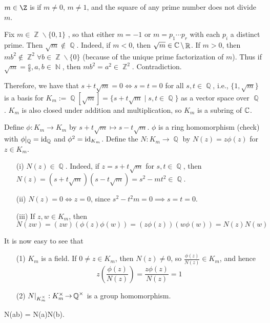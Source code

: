 \documentclass[11pt]{book}
\theoremstyle{definition}   \newtheorem{defn}[counter]{Definition} %
\newcommand{\bs}{\backslash}   \newcommand{\A}{\mathcal{A}}   \newcommand{\sy}{\textnormal{Syl}}   \newcommand{\size}[1]{\left| #1 \right|}
\DeclareMathOperator{\R}{\mathbb{R}}   \DeclareMathOperator{\N}{\mathbb{N}}   \DeclareMathOperator{\z}{\mathbb{Z}}   \DeclareMathOperator{\Q}{\mathbb{Q}}
\DeclareMathOperator{\ra}{\rightarrow}   \DeclareMathOperator{\Poly}{\mathbf{P}}   \DeclareMathOperator{\spn}{\textnormal{span}}   \DeclareMathOperator{\aut}{\textnormal{Aut}}
\newcommand{\vs}{\vspace{8pt}}
\numberwithin{counter}{chapter}
\begin{document}
\vs

\begin{def}
	$m \in \Z$ is  if $m \not= 0$, $m \not= 1$, and the square of any prime number does not divide $m$.
\end{def}


\begin{remark}
Fix $m \in \z\bs\{0,1\}$ , so that either $m = -1$ or $m = p_1 \cdots p_r$ with each $p_i$ a distinct prime. Then $\sqrt{m} \notin \Q$. Indeed, if $m < 0$, then $\sqrt{m} \in \C \bs \R$. If $m > 0$, then $mb^2 \notin \z^2 \forall b \in \z\bs\{0\}$ (because of the unique prime factorization of $m$). Thus if $\sqrt{m} = \frac{a}{b}, a,b \in \N$, then $mb^2 = a^2 \in \z^2$. Contradiction.

Therefore, we have that $s + t\sqrt{m} = 0 \iff s=t=0$ for all $s,t \in \Q$, i.e., $\{1,\sqrt{m}\}$ is a basis for $K_m := \Q[\sqrt{m}] = \{s + t\sqrt{m} \mid s,t \in \Q\}$ as a vector space over $\Q$. $K_m$ is also closed under addition and multiplication, so $K_m$ is a subring of $\operatorname{\mathbb{C}}$.

Define $\phi : K_m \ra K_m$ by $s+t\sqrt{m} \mapsto s-t\sqrt{m}$. $\phi$ is a ring homomorphism (check) with $\phi|_{\Q} = \id_{\Q}$ and $\phi^2 = \textnormal{id}_{K_m}$. Define the  $N : K_m \ra \Q$ by $N(z) = z \phi(z)$ for $z \in K_m$.
\begin{enumerate}
\item[(i)] $N(z) \in \Q$. Indeed, if $z = s+t\sqrt{m}$ for $s,t \in \Q$, then $N(z) = (s+t\sqrt{m})(s-t\sqrt{m}) = s^2-mt^2 \in \Q$.
\item[(ii)] $N(z) =0 \iff z=0$, since $s^2-t^2m = 0 \implies s=t=0$.
\item[(iii)] If $z,w \in K_m$, then
	\[N(zw) = (zw)(\phi(z)\phi(w)) = (z\phi(z))(w\phi(w)) = N(z)N(w) \]
\end{enumerate}
It is now easy to see that
\begin{enumerate}
\item[(1)] $K_m$ is a field. If $0 \ne z \in K_m$, then $N(z) \ne 0$, so $\frac{\phi(z)}{N(z)} \in K_m$, and hence
	\[z \left(\frac{\phi(z)}{N(z)}\right) = \frac{z \phi(z)}{N(z)} = 1 \]
\item[(2)] $N|_{K_m\x} : K_m\x \ra \Q\x$ is a group homomorphism.
\end{enumerate}
\end{remark}

\vs

\begin{thm}
	N(ab) = N(a)N(b).
\end{thm}
\end{document}
